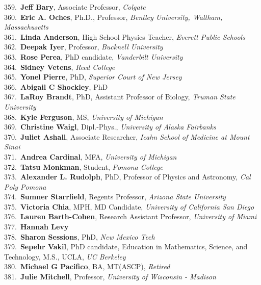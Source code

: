 359.~{\bf Jeff Bary}, Associate Professor, {\sl Colgate} \\
360.~{\bf Eric A. Oches}, Ph.D., Professor, {\sl Bentley University, Waltham, Massachusetts} \\
361.~{\bf Linda Anderson}, High School Physics Teacher, {\sl Everett Public Schools} \\
362.~{\bf Deepak Iyer}, Professor, {\sl Bucknell University} \\
363.~{\bf Rose Perea}, PhD candidate, {\sl Vanderbilt University} \\
364.~{\bf Sidney Vetens}, {\sl Reed College} \\
365.~{\bf Yonel Pierre}, PhD, {\sl Superior Court of New Jersey} \\
366.~{\bf Abigail C Shockley}, PhD \\
367.~{\bf LaRoy Brandt}, PhD, Assistant Professor of Biology, {\sl Truman State University} \\
368.~{\bf Kyle Ferguson}, MS, {\sl University of Michigan} \\
369.~{\bf Christine Waigl}, Dipl.-Phys., {\sl University of Alaska Fairbanks} \\
370.~{\bf Juliet Ashall}, Associate Researcher, {\sl Icahn School of Medicine at Mount Sinai} \\
371.~{\bf Andrea Cardinal}, MFA, {\sl University of Michigan} \\
372.~{\bf Tatsu Monkman}, Student, {\sl Pomona College} \\
373.~{\bf Alexander L. Rudolph}, PhD, Professor of Physics and Astronomy, {\sl Cal Poly Pomona} \\
374.~{\bf Sumner Starrfield}, Regents Professor, {\sl Arizona State University} \\
375.~{\bf Victoria Chia}, MPH, MD Candidate, {\sl University of California San Diego} \\
376.~{\bf Lauren Barth-Cohen}, Research Assistant Professor, {\sl University of Miami} \\
377.~{\bf Hannah Levy} \\
378.~{\bf Sharon Sessions}, PhD, {\sl New Mexico Tech} \\
379.~{\bf Sepehr Vakil}, PhD candidate, Education in Mathematics, Science, and Technology, M.S., UCLA, {\sl UC Berkeley} \\
380.~{\bf Michael G Pacifico}, BA, MT(ASCP), {\sl Retired} \\
381.~{\bf Julie Mitchell}, Professor, {\sl University of Wisconsin - Madison} \\
